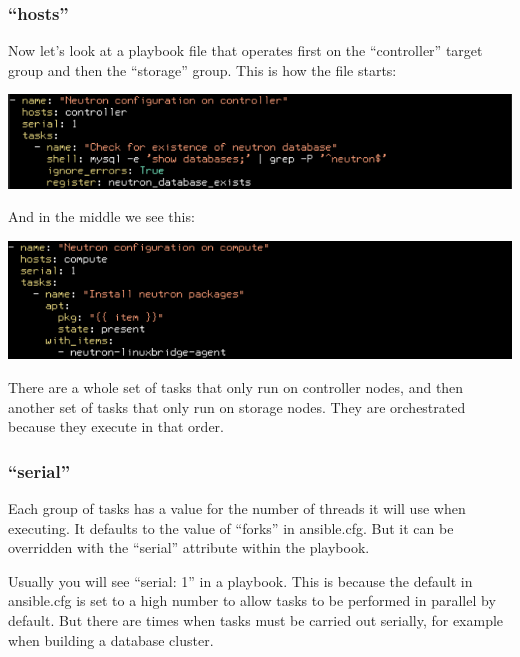 \documentclass[helvetica,english,utf8,notitle,nologo]{beamer}
\begin{document}
\begin{frame}
  \frametitle{``hosts''}

  Now let's look at a playbook file that operates first on the
  ``controller'' target group and then the ``storage'' group. This is
  how the file starts:

  \includegraphics[scale=0.44]{img_26}

  And in the middle we see this:

  \includegraphics[scale=0.44]{img_27}

There are a whole set of tasks that only run on controller nodes, and
then another set of tasks that only run on storage nodes. They are
orchestrated because they execute in that order.
\end{frame}

\begin{frame}
  \frametitle{``serial''}

  Each group of tasks has a value for the number of threads it will use
  when executing. It defaults to the value of ``forks'' in
  ansible.cfg. But it can be overridden with the ``serial'' attribute
  within the playbook.

  Usually you will see ``serial: 1'' in a playbook. This is because
  the default in ansible.cfg is set to a high number to allow tasks to
  be performed in parallel by default. But there are times when tasks
  must be carried out serially, for example when building a database
  cluster.
\end{frame}
\end{document}
